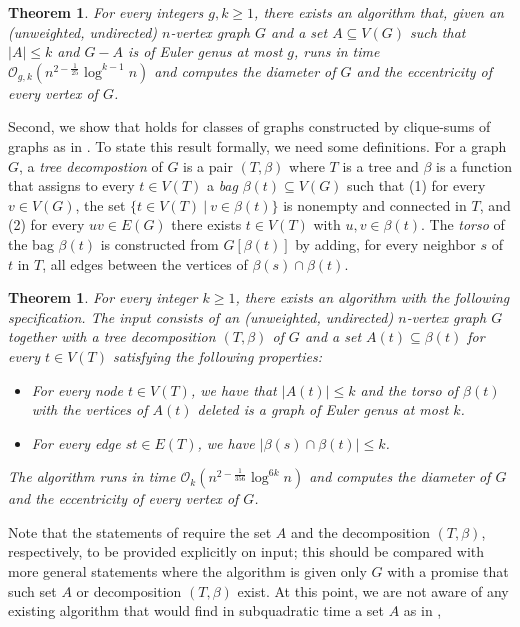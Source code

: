 \documentclass[11pt,a4paper]{article}
\newtheorem{theorem}[lemma]{Theorem}
\newcommand{\Oh}{\mathcal{O}}
\renewcommand{\leq}{\leqslant}
\renewcommand{\geq}{\geqslant}
\begin{document}
\begin{theorem}\label{thm:main-apices}
For every integers $g,k \geq 1$, 
there exists an algorithm that, given an (unweighted, undirected) $n$-vertex graph $G$
and a set $A \subseteq V(G)$ such that $|A| \leq k$ and $G-A$ is
of Euler genus at most $g$, runs in time $\Oh_{g,k}(n^{2-\frac{1}{25}} \log^{k-1} n)$
and computes the diameter of $G$ and the eccentricity of every vertex of $G$.
\end{theorem}
Second, we show that  holds for classes of graphs
constructed by clique-sums of graphs as in .
To state this result formally, we need some definitions. For a graph $G$,
   a \emph{tree decompostion} of $G$ is a pair $(T,\beta)$ where $T$ is a tree
  and $\beta$ is a function that assigns to every $t \in V(T)$ a \emph{bag} 
  $\beta(t) \subseteq V(G)$ such that (1) for every $v \in V(G)$, the set $\{t \in V(T)~|~v \in \beta(t)\}$ is nonempty and connected in $T$, and (2) for every $uv \in E(G)$ there exists $t \in V(T)$ with $u,v \in \beta(t)$. 
 The \emph{torso} of the bag $\beta(t)$ is constructed from $G[\beta(t)]$ by adding, for every
 neighbor $s$ of $t$ in $T$, all edges between the vertices of $\beta(s) \cap \beta(t)$.
\begin{theorem}\label{thm:main-decomp}
For every integer $k \geq 1$, 
there exists an algorithm with the following specification.
The input consists of an (unweighted, undirected) $n$-vertex graph $G$
together with a tree decomposition $(T,\beta)$ of $G$ and a set $A(t) \subseteq \beta(t)$ for
every $t \in V(T)$ satisfying the following properties:
\begin{itemize}[nosep]
\item For every node $t \in V(T)$, we have that $|A(t)| \leq k$ and the torso of $\beta(t)$ with the vertices
of $A(t)$ deleted is a graph of Euler genus at most $k$.
\item For every edge $st \in E(T)$, we have $|\beta(s) \cap \beta(t)| \leq k$.
\end{itemize}
The algorithm runs in time $\Oh_k(n^{2-\frac{1}{356}} \log^{6k} n)$ and computes
the diameter of $G$ and the eccentricity of every vertex of $G$.
\end{theorem}
Note that the statements of
 require the set $A$ and
the decomposition $(T,\beta)$, respectively, to be provided explicitly on input;
this should be compared with more general statements where the algorithm is 
given only $G$ with a promise that such set $A$ or decomposition $(T,\beta)$ exist. At this point, we are not aware of any existing algorithm that would find in subquadratic time a set $A$ as in ,
\end{document}
